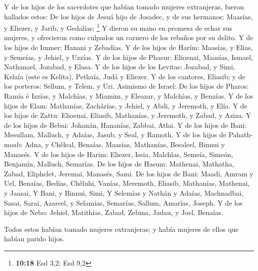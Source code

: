  Y de los hijos de los sacerdotes que habían tomado mujeres
extranjeras, fueron hallados estos: De los hijos de Jesuá hijo de
Josadec, y de sus hermanos: Maasías, y Eliezer, y Jarib, y Gedalías;
\footnote{\textbf{10:18} Esd 3,2; Esd 9,2}  Y dieron su
mano en promesa de echar sus mujeres, y ofrecieron como culpados un
carnero de los rebaños por su delito.  Y de los hijos de
Immer: Hanani y Zebadías.  Y de los hijos de Harím:
Maasías, y Elías, y Semeías, y Jehiel, y Uzzías.  Y de los
hijos de Phasur: Elioenai, Maasías, Ismael, Nathanael, Jozabad, y Elasa.
 Y de los hijos de los Levitas: Jozabad, y Simi, Kelaía
(este es Kelita), Pethaía, Judá y Eliezer.  Y de los
cantores, Eliasib; y de los porteros: Sellum, y Telem, y Uri.
 Asimismo de Israel: De los hijos de Pharos: Ramía é
Izzías, y Malchías, y Miamim, y Eleazar, y Malchías, y Benaías.
 Y de los hijos de Elam: Mathanías, Zachârías, y Jehiel, y
Abdi, y Jeremoth, y Elía.  Y de los hijos de Zattu:
Elioenai, Eliasib, Mathanías, y Jeremoth, y Zabad, y Aziza.
 Y de los hijos de Bebai: Johanán, Hananías, Zabbai, Atlai.
 Y de los hijos de Bani: Mesullam, Malluch, y Adaías,
Jasub, y Seal, y Ramoth.  Y de los hijos de Pahath-moab:
Adna, y Chêleal, Benaías, Maasías, Mathanías, Besaleel, Binnui y
Manasés.  Y de los hijos de Harim: Eliezer, Issia,
Malchîas, Semeía, Simeón,  Benjamín, Malluch, Semarías.
 De los hijos de Hasum: Mathenai, Mathatha, Zabad,
Eliphelet, Jeremai, Manasés, Sami.  De los hijos de Bani:
Maadi, Amram y Uel,  Benaías, Bedías, Chêluhi,
 Vanías, Meremoth, Eliasib,  Mathanías,
Mathenai, y Jaasai,  Y Bani, y Binnui, Simi, 
Y Selemías y Nathán y Adaías,  Machnadbai, Sasai, Sarai,
 Azareel, y Selamías, Semarías,  Sallum,
Amarías, Joseph.  Y de los hijos de Nebo: Jehiel,
Matithías, Zabad, Zebina, Jadau, y Joel, Benaías.

 Todos estos habían tomado mujeres extranjeras; y había
mujeres de ellos que habían parido hijos.
